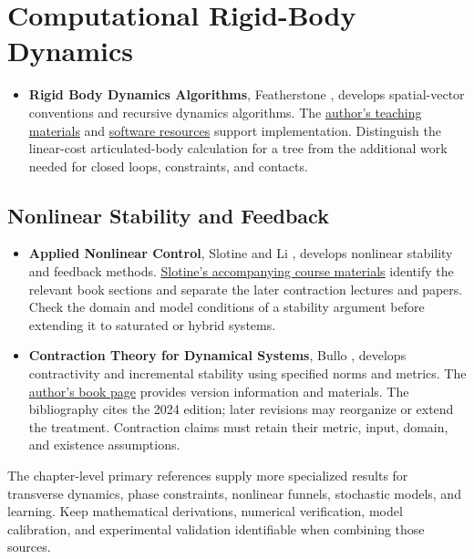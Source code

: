\section*{Computational Rigid-Body Dynamics}

\begin{itemize}
\item \textbf{Rigid Body Dynamics Algorithms}, Featherstone \cite{Featherstone2008}, develops spatial-vector conventions and recursive dynamics algorithms. The \href{https://royfeatherstone.org/teaching/index.html}{author's teaching materials} and \href{https://royfeatherstone.org/}{software resources} support implementation. Distinguish the linear-cost articulated-body calculation for a tree from the additional work needed for closed loops, constraints, and contacts.
\end{itemize}

\begin{samepage}
\section*{Nonlinear Stability and Feedback}

\begin{itemize}
\item \textbf{Applied Nonlinear Control}, Slotine and Li \cite{SlotineLi1991}, develops nonlinear stability and feedback methods. \href{https://www.mit.edu/~nsl/videos/lectures.html}{Slotine's accompanying course materials} identify the relevant book sections and separate the later contraction lectures and papers. Check the domain and model conditions of a stability argument before extending it to saturated or hybrid systems.
\item \textbf{Contraction Theory for Dynamical Systems}, Bullo \cite{BulloContraction}, develops contractivity and incremental stability using specified norms and metrics. The \href{https://fbullo.github.io/ctds}{author's book page} provides version information and materials. The bibliography cites the 2024 edition; later revisions may reorganize or extend the treatment. Contraction claims must retain their metric, input, domain, and existence assumptions.
\end{itemize}

The chapter-level primary references supply more specialized results for transverse dynamics, phase constraints, nonlinear funnels, stochastic models, and learning. Keep mathematical derivations, numerical verification, model calibration, and experimental validation identifiable when combining those sources.

\nocite{LohmillerSlotine1998, ManchesterSlotine2017, Khatib1987, Shiriaev2010}

\end{samepage}
\clearpage
\endgroup
